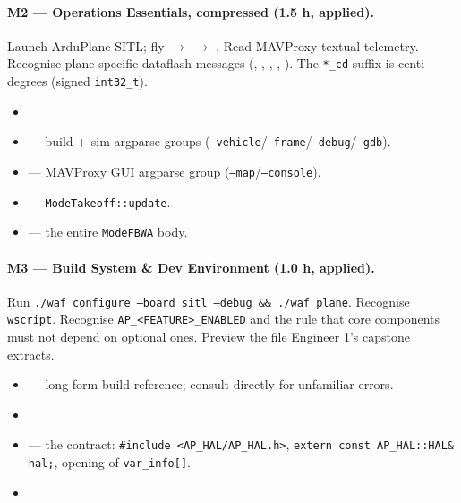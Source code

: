 \documentclass[a4paper,11pt,twoside]{article}
\begin{document}
\paragraph{M2 --- Operations Essentials, compressed (1.5 h, applied).}
Launch ArduPlane SITL; fly  $\rightarrow$  $\rightarrow$ . Read MAVProxy textual telemetry. Recognise plane-specific dataflash messages (, , , , ). The \texttt{*\_cd} suffix is centi-degrees (signed \texttt{int32\_t}).
\begin{itemize}
  \item {}
  \item {} --- build + sim argparse groups (\texttt{--vehicle}/\texttt{--frame}/\texttt{--debug}/\texttt{--gdb}).
  \item {} --- MAVProxy GUI argparse group (\texttt{--map}/\texttt{--console}).
  \item {} --- \texttt{ModeTakeoff::update}.
  \item {} --- the entire \texttt{ModeFBWA} body.
\end{itemize}

\paragraph{M3 --- Build System \& Dev Environment (1.0 h, applied).}
Run \texttt{./waf configure --board sitl --debug \&\& ./waf plane}. Recognise \texttt{wscript}. Recognise \texttt{AP\_<FEATURE>\_ENABLED} and the rule that core components must not depend on optional ones. Preview the file Engineer 1's capstone extracts.
\begin{itemize}
  \item {} --- long-form build reference; consult directly for unfamiliar errors.
  \item {}
  \item {} --- the contract: \texttt{\#include <AP\_HAL/AP\_HAL.h>}, \texttt{extern const AP\_HAL::HAL\& hal;}, opening of \texttt{var\_info[]}.
  \item {}
\end{itemize}
\end{document}
